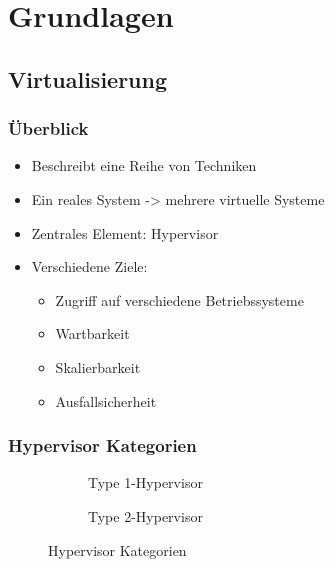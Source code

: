 \documentclass[]{beamer}
\newcommand{\inputImage}[1]{}
\begin{document}
\section{Grundlagen}
\label{sec:grundlagen}

\subsection{Virtualisierung}
\begin{frame}
\frametitle{Überblick}
    \begin{itemize}
        \item Beschreibt eine Reihe von Techniken
        \item Ein reales System -> mehrere virtuelle Systeme
        \item Zentrales Element: Hypervisor
        \item Verschiedene Ziele:
        \begin{itemize}
            \item Zugriff auf verschiedene Betriebssysteme
            \item Wartbarkeit
            \item Skalierbarkeit
            \item Ausfallsicherheit
        \end{itemize}
    \end{itemize}
\end{frame}

\begin{frame}
\frametitle{Hypervisor Kategorien}
    \begin{figure}
        \centering
        \begin{subfigure}[b]{0.49\textwidth}
            \centering
            \resizebox{0.9\linewidth}{!}{\inputImage{virt_type1.dia}}
            \caption{Type 1-Hypervisor}
            \label{fig:hypervisor_type1}
        \end{subfigure}
        \begin{subfigure}[b]{0.49\textwidth}
            \centering
            \resizebox{0.9\linewidth}{!}{\inputImage{virt_type2.dia}}
            \caption{Type 2-Hypervisor}
            \label{fig:hypervisor_type2}
        \end{subfigure}
        \caption{Hypervisor Kategorien}
        \label{fig:hypervisor}
    \end{figure}
\end{frame}
\end{document}

